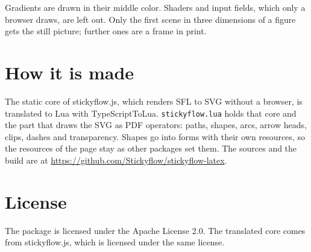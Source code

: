 \documentclass{article}
\begin{document}
Gradients are drawn in their middle color. Shaders and input fields, which only a browser draws, are left out. Only the first scene in
three dimensions of a figure gets the still picture; further ones are a frame in print.

\section{How it is made}

The static core of stickyflow.js, which renders SFL to SVG without a browser, is translated to Lua with TypeScriptToLua.
\texttt{stickyflow.lua} holds that core and the part that draws the SVG as PDF operators: paths, shapes, arcs, arrow heads, clips, dashes
and transparency. Shapes go into forms with their own resources, so the resources of the page stay as other packages set them. The sources
and the build are at \url{https://github.com/Stickyflow/stickyflow-latex}.

\section{License}

The package is licensed under the Apache License 2.0. The translated core comes from stickyflow.js, which is licensed under the same
license.
\end{document}
